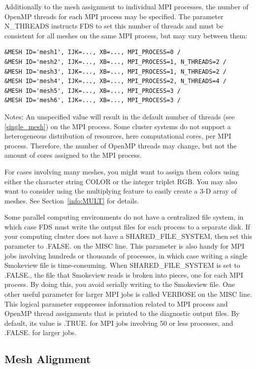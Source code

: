 \documentclass[11pt]{book}
\begin{document}
Additionally to the mesh assignment to individual MPI processes, the number of OpenMP threads for each MPI process may be specified. The parameter {\ct N\_THREADS} instructs FDS to set this number of threads and must be consistent for all meshes on the same MPI process, but may vary between them:
\begin{lstlisting}
&MESH ID='mesh1', IJK=..., XB=..., MPI_PROCESS=0 /
&MESH ID='mesh2', IJK=..., XB=..., MPI_PROCESS=1, N_THREADS=2 /
&MESH ID='mesh3', IJK=..., XB=..., MPI_PROCESS=1, N_THREADS=2 /
&MESH ID='mesh4', IJK=..., XB=..., MPI_PROCESS=2, N_THREADS=4 /
&MESH ID='mesh5', IJK=..., XB=..., MPI_PROCESS=3 /
&MESH ID='mesh6', IJK=..., XB=..., MPI_PROCESS=3 /
\end{lstlisting}
Notes: An unspecified value will result in the default number of threads (see \ref{single_mesh}) on the MPI process. Some cluster systems do not support a heterogeneous distribution of resources, here computational cores, per MPI process. Therefore, the number of OpenMP threads may change, but not the amount of cores assigned to the MPI process.

For cases involving many meshes, you might want to assign them colors using either the character string {\ct COLOR} or the integer triplet {\ct RGB}. You may also want to consider using the multiplying feature to easily create a 3-D array of meshes. See Section~\ref{info:MULT} for details.

Some parallel computing environments do not have a centralized file system, in which case FDS must write the output files for each process to a separate disk. If your computing cluster does not have a {\ct SHARED\_FILE\_SYSTEM}, then set this parameter to {\ct .FALSE.} on the {\ct MISC} line. This parameter is also handy for MPI jobs involving hundreds or thousands of processes, in which case writing a single Smokeview file is time-consuming. When {\ct SHARED\_FILE\_SYSTEM} is set to {\ct .FALSE.}, the file that Smokeview reads is broken into pieces, one for each MPI process. By doing this, you avoid serially writing to the Smokeview file. One other useful parameter for larger MPI jobs is called {\ct VERBOSE} on the {\ct MISC} line. This logical parameter suppresses information related to MPI process and OpenMP thread assignments that is printed to the diagnostic output files. By default, its value is {\ct .TRUE.} for MPI jobs involving 50 or less processes, and {\ct .FALSE.} for larger jobs.


\subsection{Mesh Alignment}
\end{document}
